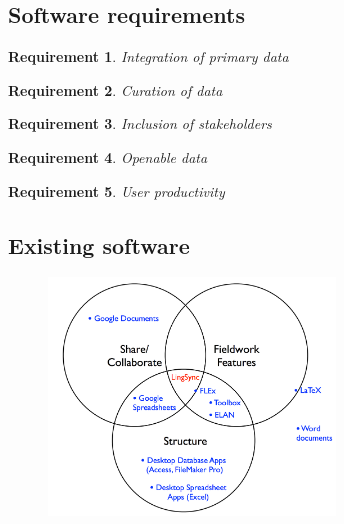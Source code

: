 \documentclass{beamer}
\newtheorem{requirement}{Requirement}
\begin{document}
\subsection[Requirements]{Software requirements}

\begin{frame}


\begin{requirement}
	\label{req:primary-data}
       Integration of primary data
\end{requirement}


\begin{requirement}
	\label{req:curation}
       Curation of data
\end{requirement}


\begin{requirement}
	\label{req:inclusive}
       Inclusion of stakeholders
\end{requirement}

\begin{requirement}
	\label{req:openable}
       Openable data
\end{requirement}


\begin{requirement}
	\label{req:productivity}
       User productivity
\end{requirement}
\end{frame}


\subsection{Existing software}

\begin{frame}


\begin{figure}
\begin{center}
\includegraphics[width=3in]{../figures/other_software_sets}
\label{othersoftware}
\end{center}
\end{figure}

\end{frame}
\end{document}
